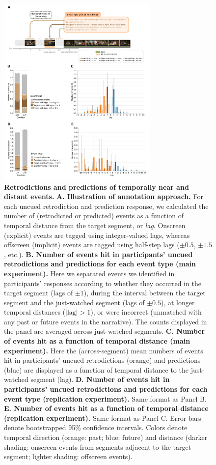 \documentclass[10pt]{article}
\begin{document}
\begin{figure}[tp]
  \centering
  \includegraphics[width=0.7\textwidth]{results2}

  \caption{\textbf{Retrodictions and predictions of temporally near and distant events.} \textbf{A. Illustration of annotation approach.} For each uncued retrodiction and prediction response, we calculated the number of (retrodicted or predicted) events as a function of temporal distance from the target segment, or \textit{lag}. Onscreen (explicit) events are tagged using integer-valued lags, whereas offscreen (implicit) events are tagged using half-step lags ($\pm 0.5$, $\pm 1.5$, etc.). \textbf{B. Number of events hit in participants' uncued retrodictions and predictions for each event type (main experiment).} Here we separated events we identified in participants' responses according to whether they occurred in the target segment (lags of $\pm 1$), during the interval between the target segment and the just-watched segment (lags of $\pm 0.5$), at longer temporal distances ($|\mathrm{lag}| > 1$), or were incorrect (unmatched with any past or future events in the narrative). The counts displayed in the panel are averaged across just-watched segments. \textbf{C. Number of events hit as a function of temporal distance (main experiment).} Here the (across-segment) mean numbers of events hit in participants' uncued retrodictions (orange) and predictions (blue) are displayed as a function of temporal distance to the just-watched segment (lag). \textbf{D. Number of events hit in participants' uncued retrodictions and predictions for each event type (replication experiment).} Same format as Panel B.  \textbf{E. Number of events hit as a function of temporal distance (replication experiment).} Same format as Panel C.  Error bars denote bootstrapped 95\% confidence intervals. Colors denote temporal direction (orange: past; blue: future) and distance (darker shading: onscreen events from segments adjacent to the target segment; lighter shading: offscreen events).}

  \label{fig:result2}
\end{figure}
\end{document}
